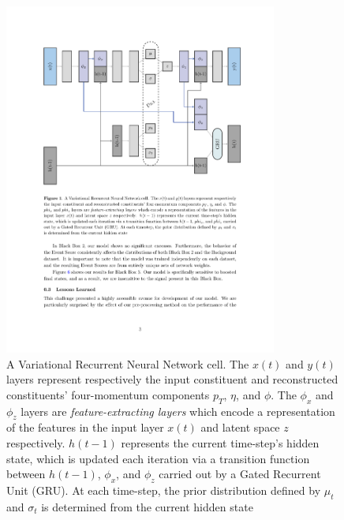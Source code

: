 \documentclass[letterpaper,11pt]{article}
\begin{document}
\begin{figure}
  \begin{center}
  
   \includegraphics[width=0.8\textwidth]{imgs/VRNN_Diagram.pdf}
  
  \end{center}
  \caption{A Variational Recurrent Neural Network cell. The $x(t)$ and $y(t)$ layers represent respectively the input constituent and reconstructed constituents' four-momentum components $p_{T}$, $\eta$, and $\phi$. The $\phi_{x}$ and $\phi_{z}$ layers are \textit{feature-extracting layers} which encode a representation of the features in the input layer $x(t)$ and latent space $z$ respectively. $h(t-1)$ represents the current time-step's hidden state, which is updated each iteration via a transition function between $h(t-1)$, $\phi_{x}$, and $\phi_{z}$ carried out by a Gated Recurrent Unit (GRU). At each time-step, the prior distribution defined by $\mu_{t}$ and $\sigma_{t}$ is determined from the current hidden state}
  \label{fig:VRNN}
\end{figure}


\end{document}
